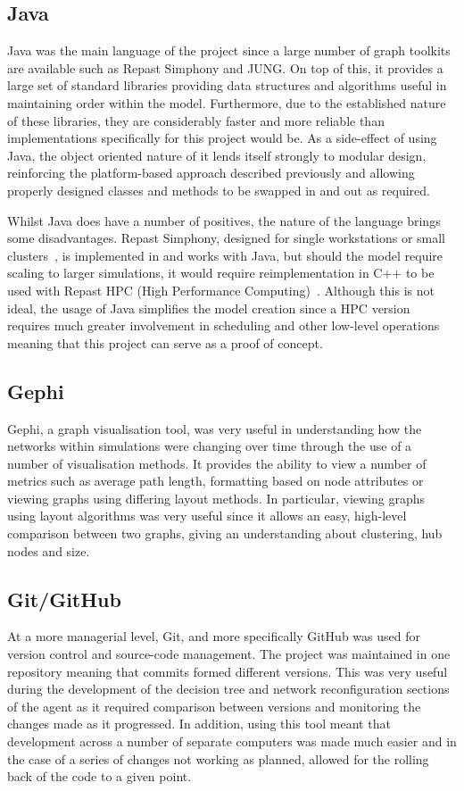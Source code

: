 \documentclass[]{report}
\begin{document}
\subsection{Java}
Java was the main language of the project since a large number of graph toolkits are available such as Repast Simphony and JUNG. On top of this, it provides a large set of standard libraries providing data structures and algorithms useful in maintaining order within the model. Furthermore, due to the established nature of these libraries, they are considerably faster and more reliable than implementations specifically for this project would be. As a side-effect of using Java, the object oriented nature of it lends itself strongly to modular design, reinforcing the platform-based approach described previously and allowing properly designed classes and methods to be swapped in and out as required.

Whilst Java does have a number of positives, the nature of the language brings some disadvantages. Repast Simphony, designed for single workstations or small clusters~\cite{repast-simp}, is implemented in and works with Java, but should the model require scaling to larger simulations, it would require reimplementation in C++ to be used with Repast HPC (High Performance Computing)~\cite{repast-HPC}. Although this is not ideal, the usage of Java simplifies the model creation since a HPC version requires much greater involvement in scheduling and other low-level operations meaning that this project can serve as a proof of concept.

\subsection{Gephi}
Gephi, a graph visualisation tool, was very useful in understanding how the networks within simulations were changing over time through the use of a number of visualisation methods. It provides the ability to view a number of metrics such as average path length, formatting based on node attributes or viewing graphs using differing layout methods. In particular, viewing graphs using layout algorithms was very useful since it allows an easy, high-level comparison between two graphs, giving an understanding about clustering, hub nodes and size.

\subsection{Git/GitHub}
At a more managerial level, Git, and more specifically GitHub was used for version control and source-code management. The project was maintained in one repository meaning that commits formed different versions. This was very useful during the development of the decision tree and network reconfiguration sections of the agent as it required comparison between versions and monitoring the changes made as it progressed. In addition, using this tool meant that development across a number of separate computers was made much easier and in the case of a series of changes not working as planned, allowed for the rolling back of the code to a given point.
\end{document}
